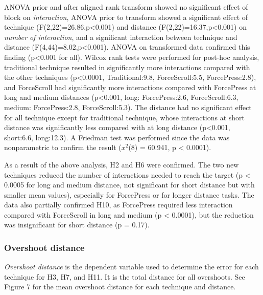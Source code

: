 \documentclass{sigchi}
\begin{document}
ANOVA prior and after aligned rank transform showed no significant effect of block on \textit{interaction}, ANOVA prior to transform showed a significant effect of technique (F(2,22)=26.86,p<0.001) and distance (F(2,22)=16.37,p<0.001) on \textit{number of interaction}, and a significant interaction between technique and distance (F(4,44)=8.02,p<0.001). ANOVA on transformed data confirmed this finding (p<0.001 for all). Wilcox rank tests were performed for post-hoc analysis, traditional technique resulted in significantly more interactions compared with the other techniques (p<0.0001, Traditional:9.8, ForceScroll:5.5, ForcePress:2.8), and ForceScroll had significantly more interactions compared with ForcePress at long and medium distances (p<0.001, long: ForcePress:2.6, ForceScroll:6.3, medium: ForcePress:2.8, ForceScroll:5.3). The distance had no significant effect for all technique except for traditional technique, whose interactions at short distance was significantly less compared with at long distance (p<0.001, short:6.6, long:12.3). A Friedman test was performed since the data was nonparametric to confirm the result ($x^{2}$(8) = 60.941, p < 0.0001).%

As a result of the above analysis, H2 and H6 were confirmed. The two new techniques reduced the number of interactions needed to reach the target (p < 0.0005 for long and medium distance, not significant for short distance but with smaller mean values), especially for ForcePress or for longer distance tasks. The data also partially confirmed H10, as ForcePress required less interaction compared with ForceScroll in long and medium (p < 0.0001), but the reduction was insignificant for short distance (p = 0.17).

\subsubsection{Overshoot distance}  
\textit{Overshoot distance} is the dependent variable used to determine the error for each technique for H3, H7, and H11. It is the total distance for all overshoots. See Figure 7 for the mean overshoot distance for each technique and distance.
\end{document}
